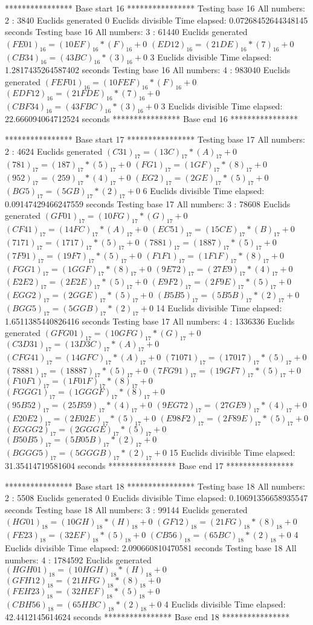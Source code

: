 **************** Base start 16 ****************
Testing base 16 All numbers: 2 :
	 3840 Euclids generated
	 0 Euclids divisible
Time elapsed: 0.07268452644348145 seconds
Testing base 16 All numbers: 3 :
	 61440 Euclids generated
	$(FE01)_{16}=(10EF)_{16}*(F)_{16}+0$
	$(ED12)_{16}=(21DE)_{16}*(7)_{16}+0$
	$(CB34)_{16}=(43BC)_{16}*(3)_{16}+0$
	 3 Euclids divisible
Time elapsed: 1.2817435264587402 seconds
Testing base 16 All numbers: 4 :
	 983040 Euclids generated
	$(FEF01)_{16}=(10FEF)_{16}*(F)_{16}+0$
	$(EDF12)_{16}=(21FDE)_{16}*(7)_{16}+0$
	$(CBF34)_{16}=(43FBC)_{16}*(3)_{16}+0$
	 3 Euclids divisible
Time elapsed: 22.666094064712524 seconds
**************** Base end 16 ****************

**************** Base start 17 ****************
Testing base 17 All numbers: 2 :
	 4624 Euclids generated
	$(C31)_{17}=(13C)_{17}*(A)_{17}+0$
	$(781)_{17}=(187)_{17}*(5)_{17}+0$
	$(FG1)_{17}=(1GF)_{17}*(8)_{17}+0$
	$(952)_{17}=(259)_{17}*(4)_{17}+0$
	$(EG2)_{17}=(2GE)_{17}*(5)_{17}+0$
	$(BG5)_{17}=(5GB)_{17}*(2)_{17}+0$
	 6 Euclids divisible
Time elapsed: 0.09147429466247559 seconds
Testing base 17 All numbers: 3 :
	 78608 Euclids generated
	$(GF01)_{17}=(10FG)_{17}*(G)_{17}+0$
	$(CF41)_{17}=(14FC)_{17}*(A)_{17}+0$
	$(EC51)_{17}=(15CE)_{17}*(B)_{17}+0$
	$(7171)_{17}=(1717)_{17}*(5)_{17}+0$
	$(7881)_{17}=(1887)_{17}*(5)_{17}+0$
	$(7F91)_{17}=(19F7)_{17}*(5)_{17}+0$
	$(F1F1)_{17}=(1F1F)_{17}*(8)_{17}+0$
	$(FGG1)_{17}=(1GGF)_{17}*(8)_{17}+0$
	$(9E72)_{17}=(27E9)_{17}*(4)_{17}+0$
	$(E2E2)_{17}=(2E2E)_{17}*(5)_{17}+0$
	$(E9F2)_{17}=(2F9E)_{17}*(5)_{17}+0$
	$(EGG2)_{17}=(2GGE)_{17}*(5)_{17}+0$
	$(B5B5)_{17}=(5B5B)_{17}*(2)_{17}+0$
	$(BGG5)_{17}=(5GGB)_{17}*(2)_{17}+0$
	 14 Euclids divisible
Time elapsed: 1.6511385440826416 seconds
Testing base 17 All numbers: 4 :
	 1336336 Euclids generated
	$(GFG01)_{17}=(10GFG)_{17}*(G)_{17}+0$
	$(C3D31)_{17}=(13D3C)_{17}*(A)_{17}+0$
	$(CFG41)_{17}=(14GFC)_{17}*(A)_{17}+0$
	$(71071)_{17}=(17017)_{17}*(5)_{17}+0$
	$(78881)_{17}=(18887)_{17}*(5)_{17}+0$
	$(7FG91)_{17}=(19GF7)_{17}*(5)_{17}+0$
	$(F10F1)_{17}=(1F01F)_{17}*(8)_{17}+0$
	$(FGGG1)_{17}=(1GGGF)_{17}*(8)_{17}+0$
	$(95B52)_{17}=(25B59)_{17}*(4)_{17}+0$
	$(9EG72)_{17}=(27GE9)_{17}*(4)_{17}+0$
	$(E20E2)_{17}=(2E02E)_{17}*(5)_{17}+0$
	$(E98F2)_{17}=(2F89E)_{17}*(5)_{17}+0$
	$(EGGG2)_{17}=(2GGGE)_{17}*(5)_{17}+0$
	$(B50B5)_{17}=(5B05B)_{17}*(2)_{17}+0$
	$(BGGG5)_{17}=(5GGGB)_{17}*(2)_{17}+0$
	 15 Euclids divisible
Time elapsed: 31.35414719581604 seconds
**************** Base end 17 ****************

**************** Base start 18 ****************
Testing base 18 All numbers: 2 :
	 5508 Euclids generated
	 0 Euclids divisible
Time elapsed: 0.10691356658935547 seconds
Testing base 18 All numbers: 3 :
	 99144 Euclids generated
	$(HG01)_{18}=(10GH)_{18}*(H)_{18}+0$
	$(GF12)_{18}=(21FG)_{18}*(8)_{18}+0$
	$(FE23)_{18}=(32EF)_{18}*(5)_{18}+0$
	$(CB56)_{18}=(65BC)_{18}*(2)_{18}+0$
	 4 Euclids divisible
Time elapsed: 2.090660810470581 seconds
Testing base 18 All numbers: 4 :
	 1784592 Euclids generated
	$(HGH01)_{18}=(10HGH)_{18}*(H)_{18}+0$
	$(GFH12)_{18}=(21HFG)_{18}*(8)_{18}+0$
	$(FEH23)_{18}=(32HEF)_{18}*(5)_{18}+0$
	$(CBH56)_{18}=(65HBC)_{18}*(2)_{18}+0$
	 4 Euclids divisible
Time elapsed: 42.4412145614624 seconds
**************** Base end 18 ****************

